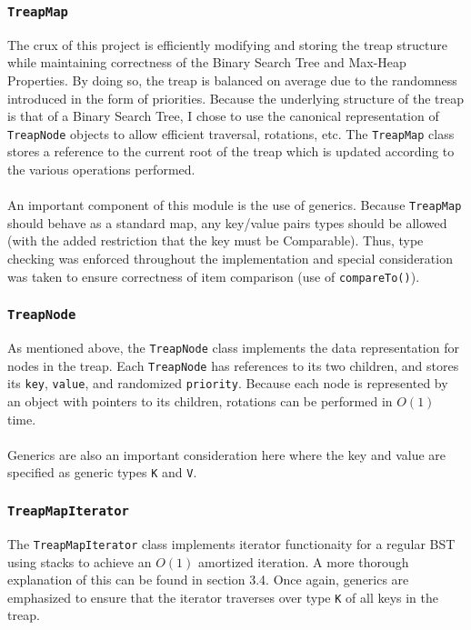 \documentclass[11pt]{article}
\def\tt{\texttt}
\def\TM{\tt{TreapMap}}
\def\tn{\tt{TreapNode}}
\def\tmi{\tt{TreapMapIterator}}
\begin{document}
\subsubsection{\TM}
The crux of this project is efficiently modifying and storing the treap structure while maintaining correctness of the Binary Search Tree and Max-Heap Properties. By doing so, the treap is balanced on average due to the randomness introduced in the form of priorities. Because the underlying structure of the treap is that of a Binary Search Tree, I chose to use the canonical representation of \tn{} objects to allow efficient traversal, rotations, etc. The \TM{} class stores a reference to the current root of the treap which is updated according to the various operations performed. \\ \\
An important component of this module is the use of generics. Because \TM{} should behave as a standard map, any key/value pairs types should be allowed (with the added restriction that the key must be Comparable). Thus, type checking was enforced throughout the implementation and special consideration was taken to ensure correctness of item comparison (use of \tt{compareTo()}).
\subsubsection{\tn}
As mentioned above, the \tn{} class implements the data representation for nodes in the treap. Each \tn{} has references to its two children, and stores its \tt{key},  \tt{value}, and randomized \tt{priority}. Because each node is represented by an object with pointers to its children, rotations can be performed in $O(1)$ time. \\ \\
Generics are also an important consideration here where the key and value are specified as generic types \tt{K} and \tt{V}.
\subsubsection{\tmi}
The \tmi{} class implements iterator functionaity for a regular BST using stacks to achieve an $O(1)$ amortized iteration. A more thorough explanation of this can be found in section 3.4. Once again, generics are emphasized to ensure that the iterator traverses over type \tt{K} of all keys in the treap.
\end{document}
